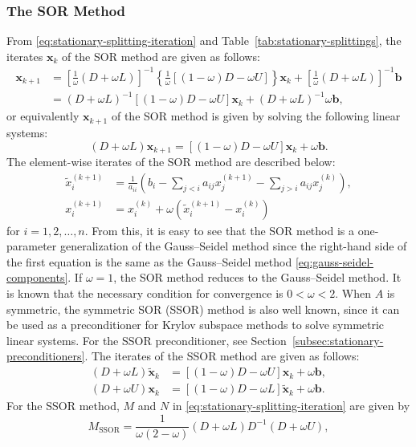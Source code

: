 \subsubsection{{The SOR Method}}\label{subsec:sor-method}
{From \eqref{eq:stationary-splitting-iteration} and Table~\ref{tab:stationary-splittings}, the iterates $\bm x_k$ of the SOR method are given as follows:}
\[
\begin{aligned}
\bm x_{k+1}&=\left[\frac1\omega(D+\omega L)\right]^{-1}
\left\{\frac1\omega[(1-\omega)D-\omega U]\right\}\bm x_k+
\left[\frac1\omega(D+\omega L)\right]^{-1}\bm b\\
&=(D+\omega L)^{-1}[(1-\omega)D-\omega U]\bm x_k+(D+\omega L)^{-1}\omega\bm b,
\end{aligned}
\]
{or equivalently $\bm x_{k+1}$ of the SOR method is given by solving the following linear systems:}
\[(D+\omega L)\bm x_{k+1}=[(1-\omega)D-\omega U]\bm x_k+\omega\bm b.\]
{The element-wise iterates of the SOR method are described below:}
\[
\begin{aligned}
\tilde x_i^{(k+1)}&=\frac1{a_{ii}}\left(b_i-\sum_{j<i}a_{ij}x_j^{(k+1)}-\sum_{j>i}a_{ij}x_j^{(k)}\right),\\
x_i^{(k+1)}&=x_i^{(k)}+\omega(\tilde x_i^{(k+1)}-x_i^{(k)})
\end{aligned}
\]
{for $i=1,2,\ldots,n$. From this, it is easy to see that the SOR method is a one-parameter generalization of the Gauss--Seidel method since the right-hand side of the first equation is the same as the Gauss--Seidel method \eqref{eq:gauss-seidel-components}. If $\omega=1$, the SOR method reduces to the Gauss--Seidel method. It is known that the necessary condition for convergence is $0<\omega<2$.}
{When $A$ is symmetric, the symmetric SOR (SSOR) method is also well known, since it can be used as a preconditioner for Krylov subspace methods to solve symmetric linear systems. For the SSOR preconditioner, see Section~\ref{subsec:stationary-preconditioners}. The iterates of the SSOR method are given as follows:}
\[
\begin{aligned}
(D+\omega L)\tilde{\bm x}_k&=[(1-\omega)D-\omega U]\bm x_k+\omega\bm b,\\
(D+\omega U)\bm x_k&=[(1-\omega)D-\omega L]\tilde{\bm x}_k+\omega\bm b.
\end{aligned}
\]
{For the SSOR method, $M$ and $N$ in \eqref{eq:stationary-splitting-iteration} are given by}
\begin{equation}\label{eq:ssor-matrix-m}
M_{\mathrm{SSOR}}=\frac1{\omega(2-\omega)}(D+\omega L)D^{-1}(D+\omega U),
\end{equation}
